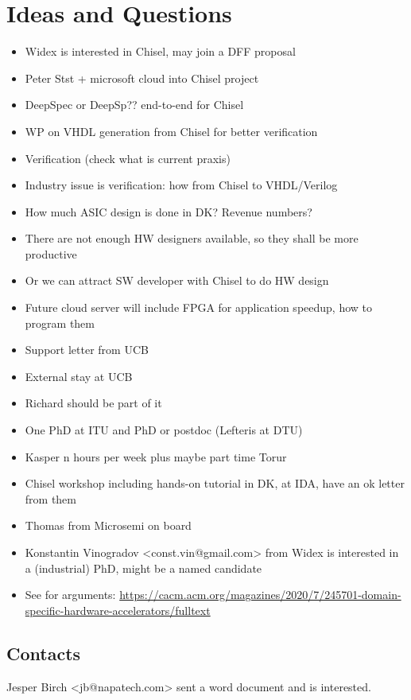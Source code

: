 \documentclass[fleqn,12pt]{article}
\begin{document}
\section{Ideas and Questions}

\begin{itemize}
\item Widex is interested in Chisel, may join a DFF proposal
\item Peter Stst + microsoft cloud into Chisel project
\item DeepSpec or DeepSp?? end-to-end for Chisel
\item WP on VHDL generation from Chisel for better verification
\item Verification (check what is current praxis)
\item Industry issue is verification: how from Chisel to VHDL/Verilog
\item How much ASIC design is done in DK? Revenue numbers?
\item There are not enough HW designers available, so they shall be more productive
\item Or we can attract SW developer with Chisel to do HW design
\item Future cloud server will include FPGA for application speedup, how to program them
\item Support letter from UCB
\item External stay at UCB
\item Richard should be part of it
\item One PhD at ITU and PhD or postdoc (Lefteris at DTU)
\item Kasper n hours per week plus maybe part time Torur
\item Chisel workshop including hands-on tutorial in DK, at IDA, have an ok letter from them
\item Thomas from Microsemi on board
\item Konstantin Vinogradov <const.vin@gmail.com> from Widex is interested in a (industrial) PhD, might be a named candidate
\item See for arguments: \url{https://cacm.acm.org/magazines/2020/7/245701-domain-specific-hardware-accelerators/fulltext}
\end{itemize}

\subsection{Contacts}

Jesper Birch <jb@napatech.com> sent a word document and is interested.
\end{document}
